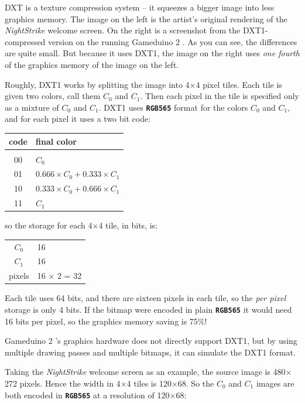 \documentclass[10pt]{book}
\newcommand{\gdtwo}{Gameduino 2 }
\newcommand{\mach}[1]{\texttt{\textbf{#1}}}
\begin{document}
DXT is a texture compression system -- it squeezes a bigger image into less graphics memory.
The image on the left is the artist's original rendering of the \textit{NightStrike} welcome screen. On the right is a screenshot
from the DXT1-compressed version on the running \gdtwo. As you can see, the differences are quite small.
But because it uses DXT1,
the image on the right uses \textit{one fourth} of the graphics memory of the image on the left.

Roughly, DXT1 works by splitting the image into 4$\times$4 pixel tiles. Each tile is given two colors, call them
$C_0$ and $C_1$. Then each pixel in the tile is specified only as a mixture of $C_0$ and $C_1$.
DXT1 uses \mach{RGB565} format for the colors $C_0$ and $C_1$, and for each pixel it uses a two bit code:

\vspace{10pt}
\begin{tabular}{cl}
code & final color \\
\hline \\
00 & $C_0$ \\
01 & $0.666 \times C_0 + 0.333 \times C_1$ \\
10 & $0.333 \times C_0 + 0.666 \times C_1$ \\
11 & $C_1$ \\
\end{tabular}
\vspace{10pt}

\noindent
so the storage for each 4$\times$4 tile, in bits, is:

\vspace{10pt}
\begin{tabular}{cl}
$C_0$ & 16 \\
$C_1$ & 16 \\
pixels & 16 $\times$ 2 = 32 \\
\end{tabular}
\vspace{10pt}

Each tile uses 64 bits, and there are sixteen pixels in each tile, so the \textit{per pixel}
storage is only 4 bits. If the bitmap were encoded in plain \mach{RGB565} it would need 16 bits per pixel,
so the graphics memory saving is 75\%!

\gdtwo's graphics hardware does not directly support DXT1, but by using multiple drawing passes and multiple bitmaps, it can
simulate the DXT1 format.

\clearpage

Taking the \textit{NightStrike} welcome screen as an example, the source image is 480$\times$272 pixels.
Hence the width in 4$\times$4 tiles is 120$\times$68. So the $C_0$ and $C_1$ images are both encoded in \mach{RGB565} at a resolution of
120$\times$68:
\end{document}
